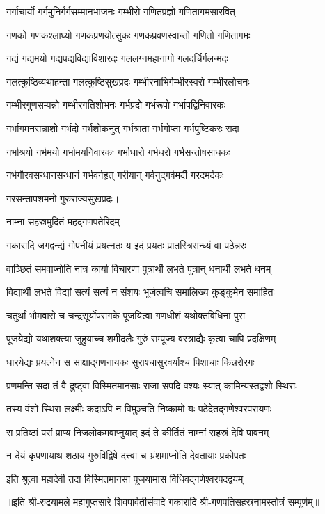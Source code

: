\twolineshloka
{गर्गाचार्यो गर्गमुनिर्गर्गसम्मानभाजनः}%
{गम्भीरो गणितप्रज्ञो गणितागमसारवित्}%

\twolineshloka
{गणको गणकश्लाघ्यो गणकप्रणयोत्सुकः}%
{गणकप्रवणस्वान्तो गणितो गणितागमः}%

\twolineshloka
{गद्यं गद्यमयो गद्यपद्यविद्याविशारदः}%
{गललग्नमहानागो गलदर्चिर्गलन्मदः}%

\twolineshloka
{गलत्कुष्ठिव्यथाहन्ता गलत्कुष्ठिसुखप्रदः}%
{गम्भीरनाभिर्गम्भीरस्वरो गम्भीरलोचनः}%

\twolineshloka
{गम्भीरगुणसम्पन्नो गम्भीरगतिशोभनः}%
{गर्भप्रदो गर्भरूपो गर्भापद्विनिवारकः}%

\twolineshloka
{गर्भागमनसन्नाशो गर्भदो गर्भशोकनुत्}%
{गर्भत्राता गर्भगोप्ता गर्भपुष्टिकरः सदा}%

\twolineshloka
{गर्भाश्रयो गर्भमयो गर्भामयनिवारकः}%
{गर्भाधारो गर्भधरो गर्भसन्तोषसाधकः}%

\twolineshloka
{गर्भगौरवसन्धानसन्धानं गर्भवर्गहृत्}%
{गरीयान् गर्वनुद्गर्वमर्दी गरदमर्दकः}%

{गरसन्तापशमनो गुरुराज्यसुखप्रदः।}%

\onelineshloka
{नाम्नां सहस्रमुदितं महद्गणपतेरिदम्}%


\twolineshloka
{गकारादि जगद्वन्द्यं गोपनीयं प्रयत्नतः}%
{य इदं प्रयतः प्रातस्त्रिसन्ध्यं वा पठेन्नरः}%

\twolineshloka
{वाञ्छितं समवाप्नोति नात्र कार्या विचारणा}%
{पुत्रार्थी लभते पुत्रान् धनार्थी लभते धनम्}%

\twolineshloka
{विद्यार्थी लभते विद्यां सत्यं सत्यं न संशयः}%
{भूर्जत्वचि समालिख्य कुङ्कुमेन समाहितः}%

\twolineshloka
{चतुर्थां भौमवारो च चन्द्रसूर्योपरागके}%
{पूजयित्वा गणधीशं यथोक्तविधिना पुरा}%

\twolineshloka
{पूजयेद्यो यथाशक्त्या जुहुयाच्च शमीदलैः}%
{गुरुं सम्पूज्य वस्त्राद्यैः कृत्वा चापि प्रदक्षिणम्}%

\twolineshloka
{धारयेद्यः प्रयत्नेन स साक्षाद्गणनायकः}%
{सुराश्चासुरवर्याश्च पिशाचाः किन्नरोरगः}%

\twolineshloka
{प्रणमन्ति सदा तं वै दुष्ट्वा विस्मितमानसाः}%
{राजा सपदि वश्यः स्यात् कामिन्यस्तद्वशो स्थिराः}%

\twolineshloka
{तस्य वंशो स्थिरा लक्ष्मीः कदाऽपि न विमुञ्चति}%
{निष्कामो यः पठेदेतद्गणेश्वरपरायणः}%

\twolineshloka
{स प्रतिष्ठां परां प्राप्य निजलोकमवाप्नुयात्}%
{इदं ते कीर्तितं नाम्नां सहस्रं देवि पावनम्}%

\twolineshloka
{न देयं कृपणायाथ शठाय गुरुविद्विषे}%
{दत्त्वा च भ्रंशमाप्नोति देवतायाः प्रकोपतः}%

\twolineshloka
{इति श्रुत्वा महादेवी तदा विस्मितमानसा}%
{पूजयामास विधिवद्गणेश्वरपदद्वयम्}%

॥इति श्री-रुद्रयामले महागुप्तसारे शिवपार्वतीसंवादे गकारादि श्री-गणपतिसहस्रनामस्तोत्रं सम्पूर्णम्॥
